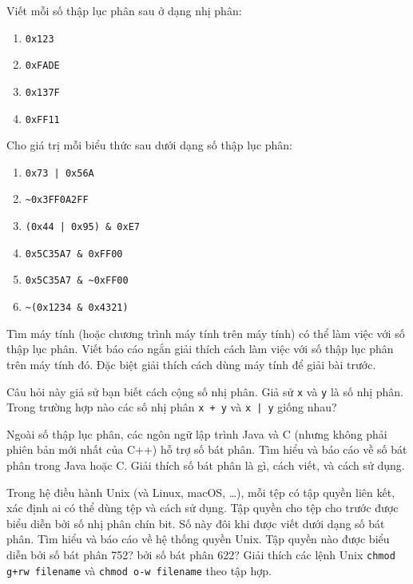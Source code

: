 \begin{exercise}
Viết mỗi số thập lục phân sau ở dạng nhị phân:
\begin{enumerate}[label=\alph*)]
\item \texttt{0x123}
\item \texttt{0xFADE}
\item \texttt{0x137F}
\item \texttt{0xFF11}
\end{enumerate}
\end{exercise}

\begin{exercise}
Cho giá trị mỗi biểu thức sau dưới dạng số thập lục phân:
\begin{enumerate}[label=\alph*)]
\item \texttt{0x73 | 0x56A}
\item \texttt{\~{}0x3FF0A2FF}
\item \texttt{(0x44 | 0x95) \& 0xE7}
\item \texttt{0x5C35A7 \& 0xFF00}
\item \texttt{0x5C35A7 \& \~{}0xFF00}
\item \texttt{\~{}(0x1234 \& 0x4321)}
\end{enumerate}
\end{exercise}

\begin{exercise}
Tìm máy tính (hoặc chương trình máy tính trên máy tính) có thể làm việc với số thập lục phân. Viết báo cáo ngắn giải thích cách làm việc với số thập lục phân trên máy tính đó. Đặc biệt giải thích cách dùng máy tính để giải bài trước.
\end{exercise}

\begin{exercise}
Câu hỏi này giả sử bạn biết cách cộng số nhị phân. Giả sử \texttt{x} và \texttt{y} là số nhị phân. Trong trường hợp nào các số nhị phân \texttt{x + y} và \texttt{x | y} giống nhau?
\end{exercise}

\begin{exercise}
Ngoài số thập lục phân, các ngôn ngữ lập trình Java và C (nhưng không phải phiên bản mới nhất của C++) hỗ trợ số bát phân. Tìm hiểu và báo cáo về số bát phân trong Java hoặc C. Giải thích số bát phân là gì, cách viết, và cách sử dụng.
\end{exercise}

\begin{exercise}
Trong hệ điều hành Unix (và Linux, macOS, \ldots), mỗi tệp có tập quyền liên kết, xác định ai có thể dùng tệp và cách sử dụng. Tập quyền cho tệp cho trước được biểu diễn bởi số nhị phân chín bit. Số này đôi khi được viết dưới dạng số bát phân. Tìm hiểu và báo cáo về hệ thống quyền Unix. Tập quyền nào được biểu diễn bởi số bát phân 752? bởi số bát phân 622? Giải thích các lệnh Unix \texttt{chmod g+rw filename} và \texttt{chmod o-w filename} theo tập hợp.
\end{exercise}

